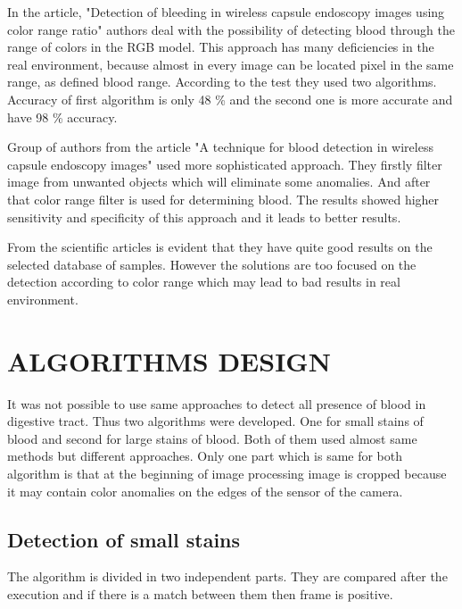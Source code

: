 \documentclass[twoside]{article}
\begin{document}
\begin{multicols}{2}
In the article, "Detection of bleeding in wireless capsule endoscopy images using color range ratio" \cite{detection} authors deal with the possibility of detecting blood through the range of colors in the RGB model. This approach has many deficiencies in the real environment, because almost in every image can be located pixel in the same range, as defined blood range. According to the test they used two algorithms. Accuracy of first algorithm is only 48 \% and the second one is more accurate and have 98 \% accuracy.


Group of authors from the article "A technique for blood detection in wireless capsule endoscopy images" \cite{technique} used more sophisticated approach. They firstly filter image from unwanted objects which will eliminate some anomalies. And after that color range filter is used for determining blood. The results showed higher sensitivity and specificity of this approach and it leads to better results.

From the scientific articles is evident that they have quite good results on the selected database of samples. However the solutions are too focused on the detection according to color range which may lead to bad results in real environment.

\section{ALGORITHMS DESIGN}
It was not possible to use same approaches to detect all presence of blood in digestive tract. Thus two algorithms were developed. One for small stains of blood and second for large stains of blood. Both of them used almost same methods but different approaches. Only one part which is same for both algorithm is that at the beginning of image processing image is cropped because it may contain color anomalies on the edges of the sensor of the camera.

\subsection{Detection of small stains}
The algorithm is divided in two independent parts. They are compared after the execution and if there is a match between them then frame is positive.


\end{multicols}
\end{document}
